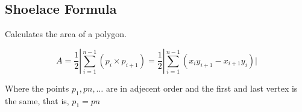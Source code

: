 \subsection{Shoelace Formula}
Calculates the area of a polygon.

$$ A = \dfrac{1}{2} | \sum_{i=1}^{n - 1} (p_{i} \times p_{i+1}) = \dfrac{1}{2} | \sum_{i=1}^{n - 1} (x_{i} y_{i+1} - x_{i+1} y_{i}) | $$

Where the points $p_{1}, p{n}, \dots$ are in adjecent order and the first and last vertex is the same, that is, $p_{1} = p{n}$

